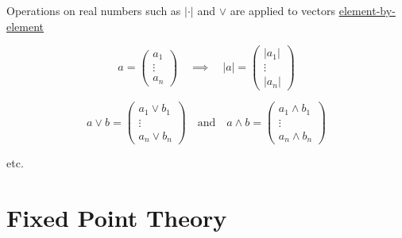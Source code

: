 \begin{frame}
    
    Operations on real numbers such as $|\cdot|$ and $\vee$ are applied to vectors 
    \underline{element-by-element}

    \vspace{1em}
    \Eg
    \begin{equation*}
        a = 
        \begin{pmatrix}
            a_1 \\
            \vdots \\
            a_n
        \end{pmatrix}
        \quad \implies \quad
        |a| = 
        \begin{pmatrix}
            |a_1| \\
            \vdots \\
            |a_n|
        \end{pmatrix}
    \end{equation*}

    \vspace{1em}

    \begin{equation*}
        a \vee b = 
        \begin{pmatrix}
            a_1 \vee b_1 \\
            \vdots \\
            a_n \vee b_n 
        \end{pmatrix}
        \quad \text{and} \quad
        a \wedge b = 
        \begin{pmatrix}
            a_1 \wedge b_1 \\
            \vdots \\
            a_n \wedge b_n 
        \end{pmatrix}
    \end{equation*}

    etc.

\end{frame}



\section{Fixed Point Theory}

